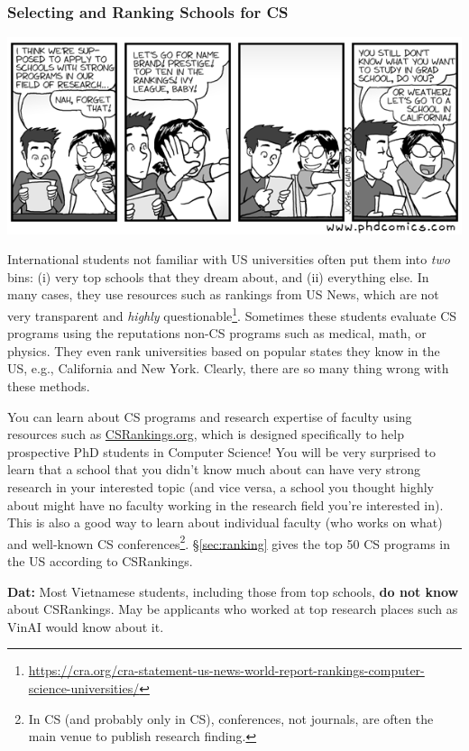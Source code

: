 \documentclass[11pt]{article}
\newenvironment{commentbox}[1][]{
\small
    \begin{cbox}
    \textbf{#1} 
 }{
   \end{cbox}
}
\begin{document}
\subsubsection{Selecting and Ranking Schools for CS}
   \begin{center}
    \includegraphics[scale=0.5]{c1.png}
   \end{center}

International students not familiar with US universities often put them into \emph{two} bins:  (i) very top schools that they dream about, and (ii) everything else.  In many cases, they use resources such as rankings from US News, which are not very transparent and \emph{highly} questionable\footnote{\url{https://cra.org/cra-statement-us-news-world-report-rankings-computer-science-universities/}}.  Sometimes these students evaluate CS programs using the reputations non-CS programs such as medical, math, or physics.
They even rank universities based on popular states they know in the US, e.g., California and New York.  Clearly, there are so many thing wrong with these methods. 

You can learn about CS programs and research expertise of faculty using resources such as \href{https://csrankings.org}{CSRankings.org}, which is designed specifically to help prospective PhD students in Computer Science!  You will be very surprised to learn that a school that you didn't know much about can have very strong research in your interested topic (and vice versa, a school you thought highly about might have no faculty working in the research field you're interested in). This is also a good way to learn about individual faculty (who works on what) and well-known CS conferences\footnote{In CS (and probably only in CS), conferences, not journals, are often the main venue to publish research finding.}. \S\ref{sec:ranking} gives the top 50 CS programs in the US according to CSRankings.

\begin{commentbox}[Dat:] Most Vietnamese students, including those from top schools, \textbf{do not know} about CSRankings.  May be applicants who worked at top research places such as VinAI would know about it.
\end{commentbox}
\end{document}
